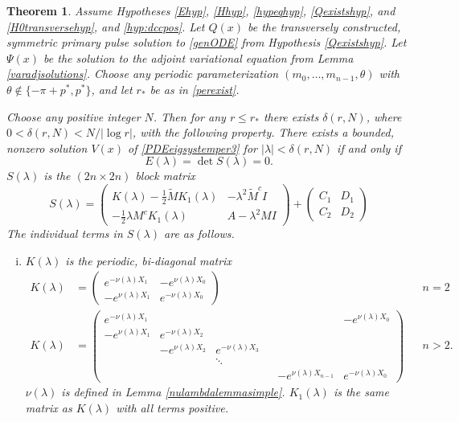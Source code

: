 \documentclass[11pt,reqno]{amsart}
\theoremstyle{plain}
\newtheorem{theorem}{Theorem}
\theoremstyle{definition}
\theoremstyle{remark}
\begin{document}
\begin{theorem}\label{blockmatrixtheorem}
Assume Hypotheses \ref{Ehyp}, \ref{Hhyp}, \ref{hypeqhyp}, \ref{Qexistshyp}, and \ref{H0transversehyp}, and \ref{hyp:dccpos}. Let $Q(x)$ be the transversely constructed, symmetric primary pulse solution to \eqref{genODE} from Hypothesis \ref{Qexistshyp}. Let $\Psi(x)$ be the solution to the adjoint variational equation from Lemma \ref{varadjsolutions}. Choose any periodic parameterization $(m_0, \dots, m_{n-1}, \theta)$ with $\theta \notin \{-\pi + p^*, p^* \}$, and let $r_*$ be as in \cref{perexist}. 

Choose any positive integer $N$. Then for any $r \leq r_*$ there exists $\delta(r,N)$, where $0 < \delta(r,N) < N/|\log r|$, with the following property. There exists a bounded, nonzero solution $V(x)$ of \cref{PDEeigsystemper3} for $|\lambda| < \delta(r,N)$ if and only if
\begin{equation}\label{blockmatrixcond}
E(\lambda) = \det S(\lambda) = 0.
\end{equation}
$S(\lambda)$ is the $(2n \times 2n)$ block matrix
\begin{equation}\label{blockeq}
S(\lambda) = 
\begin{pmatrix}
K(\lambda) -\frac{1}{2} \tilde{M} K_1(\lambda) & - \lambda^2 \tilde{M}^c I \\
-\frac{1}{2} \lambda M^c K_1(\lambda) & A - \lambda^2 MI 
\end{pmatrix}
+ \begin{pmatrix}C_1 & D_1 \\ C_2 & D_2 \end{pmatrix}
\end{equation}
The individual terms in $S(\lambda)$ are as follows.
\begin{enumerate}[(i)]
\item $K(\lambda)$ is the periodic, bi-diagonal matrix
\begin{align*}
K(\lambda) &= 
\begin{pmatrix}
e^{-\nu(\lambda)X_1} & -e^{\nu(\lambda)X_0} \\
-e^{\nu(\lambda)X_1} & e^{-\nu(\lambda)X_0}
\end{pmatrix} && n = 2 \\
K(\lambda) &=  
\begin{pmatrix}
e^{-\nu(\lambda)X_1} & & & & & -e^{\nu(\lambda)X_0} \\
-e^{\nu(\lambda)X_1} & e^{-\nu(\lambda)X_2} \\
& -e^{\nu(\lambda)X_2} & e^{-\nu(\lambda)X_3} \\
  & & \ddots & && \\
& & & & -e^{\nu(\lambda)X_{n-1}} & e^{-\nu(\lambda)X_0}
\end{pmatrix} && n > 2.
\end{align*}
$\nu(\lambda)$ is defined in Lemma \ref{nulambdalemmasimple}. $K_1(\lambda)$ is the same matrix as $K(\lambda)$ with all terms positive.


\end{enumerate}
\end{theorem}
\end{document}
